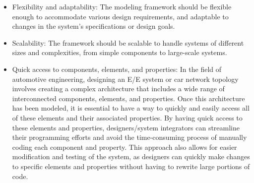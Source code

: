 \begin{itemize}
    
    
    \item Flexibility and adaptability: The modeling framework should be flexible enough to accommodate various design requirements, and adaptable to changes in the system's specifications or design goals.
    
    \item Scalability: The framework should be scalable to handle systems of different sizes and complexities, from simple components to large-scale systems.
    
    \item Quick access to components, elements, and properties: %
    In the field of automotive engineering, designing an E/E system or car network topology involves creating a complex architecture that includes a wide range of interconnected components, elements, and properties. Once this architecture has been modeled, it is essential to have a way to quickly and easily access all of these elements and their associated properties.
    By having quick access to these elements and properties, designers/system integrators can streamline their programming efforts and avoid the time-consuming process of manually coding each component and property. This approach also allows for easier modification and testing of the system, as designers can quickly make changes to specific elements and properties without having to rewrite large portions of code.


    

\end{itemize}
